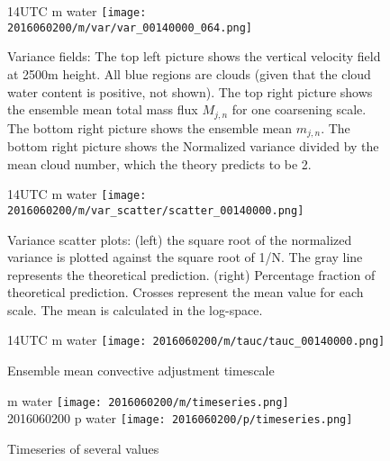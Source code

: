 \documentclass[a4paper, 12pt, draft]{article}
\begin{document}
\begin{figure}[ht] \label{fig:case1_var_fields}
\noindent {} 14UTC m water
\texttt{[image: 2016060200/m/var/var\_00140000\_064.png]}\\
\caption{Variance fields:  The top left picture shows the vertical velocity field at 2500m height. All blue regions are clouds (given that the cloud water content is positive, not shown). The top right picture shows the ensemble mean total mass flux $M_{j,n}$ for one coarsening scale. The bottom right picture shows the ensemble mean $m_{j,n}$. The bottom right picture shows the Normalized variance divided by the mean cloud number, which the theory predicts to be 2.}
\end{figure}

\begin{figure}[ht] \label{fig:case1_var_scatter}
\noindent {} 14UTC m water
\texttt{[image: 2016060200/m/var\_scatter/scatter\_00140000.png]}\\
\caption{Variance scatter plots: (left) the square root of the normalized variance is plotted against the square root of 1/N. The gray line represents the theoretical prediction. (right) Percentage fraction of theoretical prediction. Crosses represent the mean value for each scale. The mean is calculated in the log-space.}
\end{figure}

\begin{figure}[ht] \label{fig:case1_tau_c}
\noindent {} 14UTC m water
\texttt{[image: 2016060200/m/tauc/tauc\_00140000.png]}\\
\caption{Ensemble mean convective adjustment timescale}
\end{figure}

\begin{figure}[ht] \label{fig:case1_timeseries}
\noindent {} m water
\texttt{[image: 2016060200/m/timeseries.png]}\\
2016060200 p water
\texttt{[image: 2016060200/p/timeseries.png]}\\
\caption{Timeseries of several values}
\end{figure}
\end{document}
